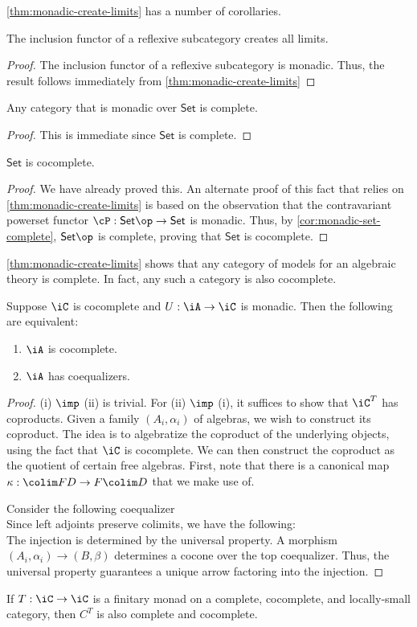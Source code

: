 \documentclass{amsart}
\begin{document}
\cref{thm:monadic-create-limits} has a number of corollaries.

\begin{cor}
  The inclusion functor of a reflexive subcategory creates all limits.
\end{cor}
\begin{proof}
  The inclusion functor of a reflexive subcategory is monadic.
  Thus, the result follows immediately from \cref{thm:monadic-create-limits}
\end{proof}

\begin{cor}\label{cor:monadic-set-complete}
  Any category that is monadic over $\mathsf{Set}$ is complete.
\end{cor}
\begin{proof}
  This is immediate since $\mathsf{Set}$ is complete.
\end{proof}

\begin{cor}
  $\mathsf{Set}$ is cocomplete.
\end{cor}
\begin{proof}
  We have already proved this.
  An alternate proof of this fact that relies on \cref{thm:monadic-create-limits} is based on the observation that the contravariant powerset functor $\cP : \mathsf{Set}\op \to \mathsf{Set}$ is monadic.
  Thus, by \cref{cor:monadic-set-complete}, $\mathsf{Set}\op$ is complete, proving that $\mathsf{Set}$ is cocomplete.
\end{proof}

\cref{thm:monadic-create-limits} shows that any category of models for an algebraic theory is complete.
In fact, any such a category is also cocomplete.

\begin{thm}
  Suppose $\iC$ is cocomplete and $U : \iA \to \iC$ is monadic.
  Then the following are equivalent:
  \begin{enumerate}
  \item $\iA$ is cocomplete.
  \item $\iA$ has coequalizers.
  \end{enumerate}
\end{thm}
\begin{proof}
  (i) $\imp$ (ii) is trivial.
  For (ii) $\imp$ (i), it suffices to show that $\iC^{T}$ has coproducts.
  Given a family $(A_{i},\alpha_{i})$ of algebras, we wish to construct its coproduct.
  The idea is to algebratize the coproduct of the underlying objects, using the fact that $\iC$ is cocomplete.
  We can then construct the coproduct as the quotient of certain free algebras.
  First, note that there is a canonical map $\kappa : \colim FD \to F\colim D$ that we make use of.

  Consider the following coequalizer
  \[\]
  Since left adjoints preserve colimits, we have the following:
  \[\]
  The injection is determined by the universal property.
  A morphism $(A_{i},\alpha_{i}) \to (B,\beta)$ determines a cocone over the top coequalizer.
  Thus, the universal property guarantees a unique arrow factoring into the injection.
\end{proof}

\begin{thm}
  If $T : \iC \to \iC$ is a finitary monad on a complete, cocomplete, and locally-small category, then $C^{T}$ is also complete and cocomplete.
\end{thm}



\end{document}
